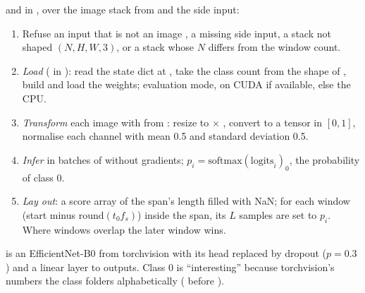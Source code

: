  and  in , over the image
stack from  and the  side input:
\begin{enumerate}
\item Refuse an input that is not an image , a missing side input, a stack not
  shaped $(N, H, W, 3)$, or a stack whose $N$ differs from the window count.
\item \emph{Load} ( in ): read the
  state dict at , take the class count from the shape of
  , build  and load the weights;
  evaluation mode, on CUDA if available, else the CPU.
\item \emph{Transform} each image with  from : resize to
   $\times$ , convert to a tensor in $[0,1]$, normalise each
  channel with mean 0.5 and standard deviation 0.5.
\item \emph{Infer} in batches of  without gradients;
  $p_i = \mathrm{softmax}(\text{logits}_i)_0$, the probability of class 0.
\item \emph{Lay out}: a score array of the span's length filled with NaN; for each window
  (start minus $\mathrm{round}(t_0 f_s)$) inside the span, its $L$ samples are set to $p_i$.
  Where windows overlap the later window wins.
\end{enumerate}
 is an EfficientNet-B0 \citep{tan2019efficientnet} from torchvision with its
head replaced by dropout ($p = 0.3$) and a linear layer to  outputs. Class 0
is ``interesting'' because torchvision's  numbers the class folders
alphabetically ( before ).

